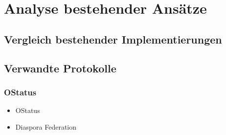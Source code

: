 
\chapter{Analyse bestehender Ansätze}
\label{ch:analysis_given_approachs}

\section{Vergleich bestehender Implementierungen}
\section{Verwandte Protokolle}
	\subsection{OStatus}
	\label{subsec:ostatus}
	\begin{itemize}
		\item OStatus
		\item Diaspora Federation
	\end{itemize}